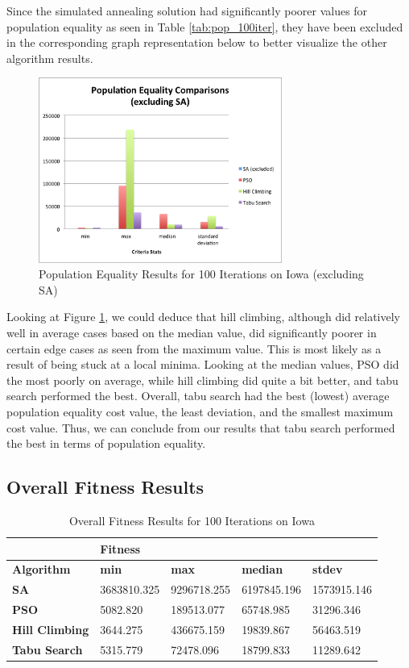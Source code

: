 \documentclass[journal]{IEEEtran}
\begin{document}
Since the simulated annealing solution had significantly poorer values for population equality as seen in Table \ref{tab:pop_100iter}, they have been excluded in the corresponding graph representation below to better visualize the other algorithm results.

\begin{figure}[h!]
    \includegraphics[width=8cm]{images/pop_equality_graph.png}
    \centering
    \caption{Population Equality Results for 100 Iterations on Iowa (excluding SA)}
    \label{fig:pop_results}
\end{figure}

Looking at Figure \ref{fig:pop_results}, we could deduce that hill climbing, although did relatively well in average cases based on the median value, did significantly poorer in certain edge cases as seen from the maximum value. This is most likely as a result of being stuck at a local minima. Looking at the median values, PSO did the most poorly on average, while hill climbing did quite a bit better, and tabu search performed the best. Overall, tabu search had the best (lowest) average population equality cost value, the least deviation, and the smallest maximum cost value. Thus, we can conclude from our results that tabu search performed the best in terms of population equality.

\subsection{Overall Fitness Results}

\begin{table}[!h]
\centering
\caption{Overall Fitness Results for 100 Iterations on Iowa}
\label{tab:fitness_100iter}
\begin{tabular}{l|llll}
                       & \multicolumn{4}{l}{\textbf{Fitness}}                          \\ \hline
\textbf{Algorithm}     & \textbf{min} & \textbf{max} & \textbf{median} & \textbf{stdev} \\ \hline
\textbf{SA}            & 3683810.325  & 9296718.255  & 6197845.196     & 1573915.146    \\
\textbf{PSO}           & 5082.820     & 189513.077   & 65748.985       & 31296.346      \\
\textbf{Hill Climbing} & 3644.275     & 436675.159   & 19839.867       & 56463.519      \\
\textbf{Tabu Search}   & 5315.779     & 72478.096    & 18799.833       & 11289.642
\end{tabular}
\end{table}
\end{document}
